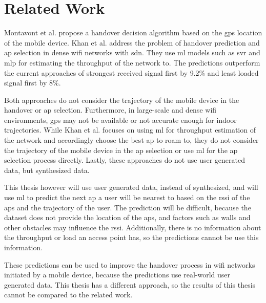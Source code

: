 \chapter{Related Work}\label{ch:related-work}

Montavont et al. \cite{handover-assisted-by-gps} propose a handover decision algorithm based on the \ac{gps} location of the mobile device.
Khan et al. \cite{MLBasedHandoverPrediction2022} address the problem of handover prediction and \ac{ap} selection in dense \ac{wifi} networks with \ac{sdn}.
They use \ac{ml} models such as \ac{svr} and \ac{mlp} for estimating the throughput of the network to.
The predictions outperform the current approaches of strongest received signal first by 9.2\% and least loaded signal first by 8\%.

Both approaches do not consider the trajectory of the mobile device in the handover or \ac{ap} selection.
Furthermore, in large-scale and dense \ac{wifi} environments, \ac{gps} may not be available or not accurate enough for indoor trajectories.
While Khan et al. focuses on using \ac{ml} for throughput estimation of the network and accordingly choose the best \ac{ap} to roam to, they do not consider the trajectory of the mobile device in the \ac{ap} selection or use \ac{ml} for the \ac{ap} selection process directly.
Lastly, these approaches do not use user generated data, but synthesized data.

This thesis however will use user generated data, instead of synthesized, and will use \ac{ml} to predict the next \ac{ap} a user will be nearest to based on the \ac{rssi} of the \acp{ap} and the trajectory of the user.
The prediction will be difficult, because the dataset does not provide the location of the \acp{ap}, and factors such as walls and other obstacles may influence the \ac{rssi}.
Additionally, there is no information about the throughput or load an access point has, so the predictions cannot be use this information.

These predictions can be used to improve the handover process in \ac{wifi} networks initiated by a mobile device, because the predictions use real-world user generated data.
This thesis has a different approach, so the results of this thesis cannot be compared to the related work.
